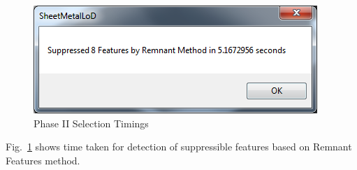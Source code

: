\begin{figure}[!h]
\centering     %
\includegraphics[width=0.6\linewidth,valign=t]{images/DefeatureRemnantTimings}
\caption{Phase II Selection Timings}
\label{fig:results:enlosurephIItimings}
\end{figure}
Fig.~\ref{fig:results:enlosurephIItimings} shows time taken for detection of suppressible features based on Remnant Features method.


%
%
%
%
%

%

